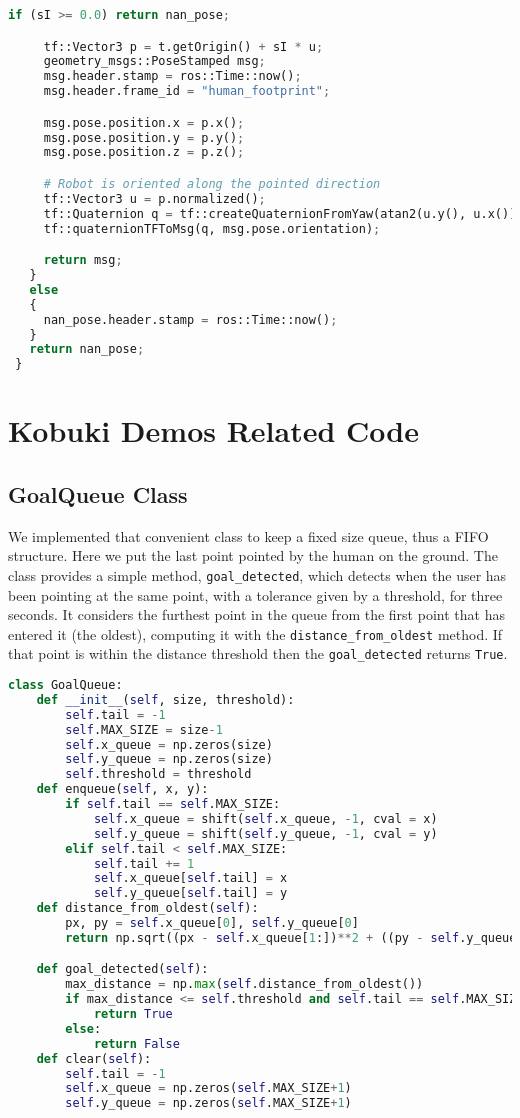 \begin{lstlisting}[caption={Point To Wall Method},label={lst:pointtowall},language=Python]
     if (sI >= 0.0) return nan_pose;

     tf::Vector3 p = t.getOrigin() + sI * u;
     geometry_msgs::PoseStamped msg;
     msg.header.stamp = ros::Time::now();
     msg.header.frame_id = "human_footprint";

     msg.pose.position.x = p.x();
     msg.pose.position.y = p.y();
     msg.pose.position.z = p.z();

     # Robot is oriented along the pointed direction
     tf::Vector3 u = p.normalized();
     tf::Quaternion q = tf::createQuaternionFromYaw(atan2(u.y(), u.x()));
     tf::quaternionTFToMsg(q, msg.pose.orientation);

     return msg;
   }
   else
   {
     nan_pose.header.stamp = ros::Time::now();
   }
   return nan_pose;
 }
 \end{lstlisting}
\section*{Kobuki Demos Related Code}
\subsection*{GoalQueue Class}
We implemented that convenient class to keep a fixed size queue, thus a \ac{FIFO} structure. Here we put the last point pointed by the human on the ground. The class provides a simple method, \texttt{goal\_detected}, which detects when the user has been pointing at the same point, with a tolerance given by a threshold, for three seconds. It considers the furthest point in the queue from the first point that has entered it (the oldest), computing it with the \texttt{distance\_from\_oldest} method. If that point is within the distance threshold then the \texttt{goal\_detected} returns \texttt{True}.
\begin{lstlisting}[caption={Goal Queue Class},label={lst:goalqueue},language=Python]
class GoalQueue:
    def __init__(self, size, threshold):
        self.tail = -1
        self.MAX_SIZE = size-1
        self.x_queue = np.zeros(size)
        self.y_queue = np.zeros(size)
        self.threshold = threshold
    def enqueue(self, x, y):
        if self.tail == self.MAX_SIZE:
            self.x_queue = shift(self.x_queue, -1, cval = x)
            self.y_queue = shift(self.y_queue, -1, cval = y)
        elif self.tail < self.MAX_SIZE:
            self.tail += 1
            self.x_queue[self.tail] = x
            self.y_queue[self.tail] = y
    def distance_from_oldest(self):
        px, py = self.x_queue[0], self.y_queue[0]
        return np.sqrt((px - self.x_queue[1:])**2 + ((py - self.y_queue[1:]))**2)

    def goal_detected(self):
        max_distance = np.max(self.distance_from_oldest())
        if max_distance <= self.threshold and self.tail == self.MAX_SIZE:
            return True
        else:
            return False
    def clear(self):
        self.tail = -1
        self.x_queue = np.zeros(self.MAX_SIZE+1)
        self.y_queue = np.zeros(self.MAX_SIZE+1)
\end{lstlisting}

